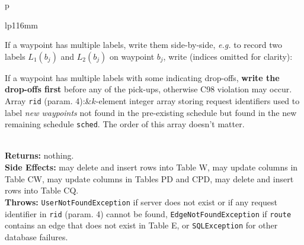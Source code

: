 \documentclass{article}
\theoremstyle{definition}                   %
\begin{document}
\begin{tabular}{p{\textwidth}}
\begin{tabular}{lp{116mm}}

If a waypoint has multiple labels, write them side-by-side, \textit{e.g.}
to record two labels $L_1(b_j)$ and $L_2(b_j)$ on waypoint $b_j$, write
(indices omitted for clarity):


If a waypoint has multiple labels with some indicating drop-offs, \textbf{write
the drop-offs first} before any of the pick-ups, otherwise C98 violation may
occur.\\
Array {\tt{}rid} (param. 4):&$k$-element integer array storing request identifiers
used to label \emph{new waypoints} not found in the pre-existing schedule but
found in the new remaining schedule {\tt{}sched}. The order of this array doesn't
matter.
\end{tabular}\\
\textbf{Returns:} nothing.\\
\textbf{Side Effects:} may delete and insert rows into Table W, may
update columns in Table CW, may update columns in Tables PD and CPD,
may delete and insert rows into Table CQ.\\
\textbf{Throws:} {\tt{}UserNotFoundException} if server does not exist or if
any request identifier in {\tt{}rid} (param. 4) cannot be found,
{\tt{}EdgeNotFoundException} if {\tt{}route} contains an edge that does not exist
in Table E, or {\tt{}SQLException} for other database failures.\\
\bottomrule
\end{tabular}
\nwenddocs{}\endmoddef{}
\end{document}
